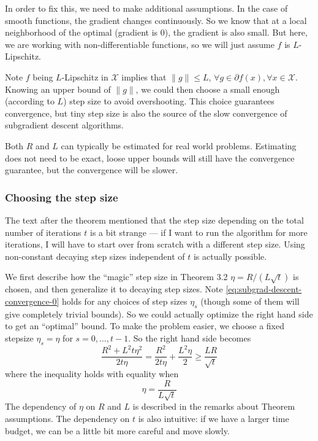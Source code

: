\documentclass{scrartcl}
\newcommand{\sX}{\mathcal{X}}
\begin{document}
In order to fix this, we need to make additional assumptions. In the case of
smooth functions, the gradient changes continuously. So we know that at a local neighborhood of the
optimal (gradient is 0), the gradient is also small. But here, we are working with
non-differentiable functions, so we will just assume $f$ is $L$-Lipschitz.

Note $f$ being $L$-Lipschitz in $\sX$ implies that $\|g\| \leq L$, $\forall g\in\partial f(x),
\forall x\in\sX$. Knowing an upper bound of $\|g\|$, we could then choose a small enough (according
to $L$) step size to avoid overshooting. This choice guarantees convergence, but tiny step size is
also the source of the slow convergence of subgradient descent algorithms.

Both $R$ and $L$ can typically be estimated for real world problems. Estimating does not need to be
exact, loose upper bounds will still have the convergence guarantee, but the convergence will be
slower.

\subsubsection*{Choosing the step size}
The text after the theorem mentioned that the step size depending on the total number of iterations
$t$ is a bit strange --- if I want to run the algorithm for more iterations, I will have to start
over from scratch with a different step size. Using non-constant decaying step sizes independent of
$t$ is actually possible.

We first describe how the ``magic'' step size in Theorem 3.2 $\eta=R/(L\sqrt{t})$ is chosen, and
then generalize it to decaying step sizes.
Note \eqref{eq:subgrad-descent-convergence-0} holds for any choices of step sizes $\eta_s$ (though
some of them will give completely trivial bounds). So we could actually optimize the right hand side
to get an ``optimal'' bound. To make the problem easier, we choose a fixed stepsize $\eta_s=\eta$
for $s=0,\ldots,t-1$. So the right hand side becomes
\begin{equation}
  \frac{R^2+L^2t\eta^2}{2t\eta} = \frac{R^2}{2t\eta} + \frac{L^2\eta}{2} \geq \frac{LR}{\sqrt{t}}
  \label{eq:subgrad-bound-fix-eta}
\end{equation}
where the inequality holds with equality when
\begin{equation}
  \eta = \frac{R}{L\sqrt{t}}
\end{equation}
The dependency of $\eta$ on $R$ and $L$ is described in the remarks about Theorem assumptions. The
dependency on $t$ is also intuitive: if we have a larger time budget, we can be a little bit more
careful and move slowly.
\end{document}
